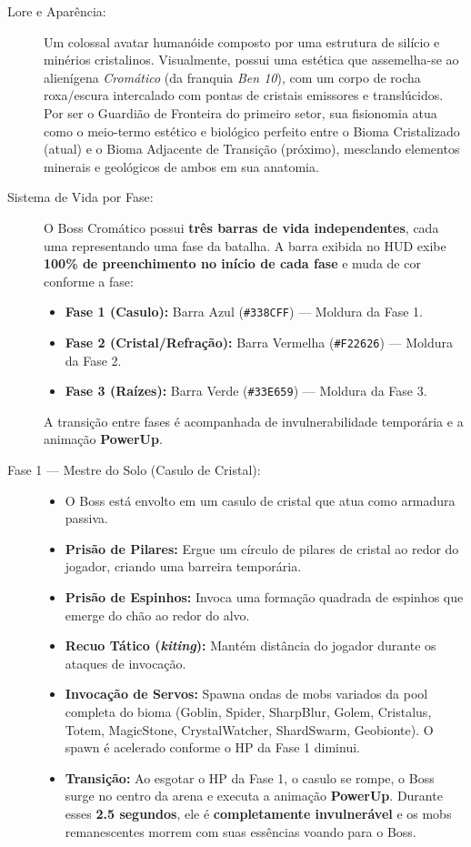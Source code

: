 \documentclass[a4paper,12pt]{report}
\begin{document}
\begin{description}
    \item[Lore e Aparência:]
    Um colossal avatar humanóide composto por uma estrutura de silício e minérios cristalinos. Visualmente, possui uma estética que assemelha-se ao alienígena \textit{Cromático} (da franquia \textit{Ben 10}), com um corpo de rocha roxa/escura intercalado com pontas de cristais emissores e translúcidos. Por ser o Guardião de Fronteira do primeiro setor, sua fisionomia atua como o meio-termo estético e biológico perfeito entre o Bioma Cristalizado (atual) e o Bioma Adjacente de Transição (próximo), mesclando elementos minerais e geológicos de ambos em sua anatomia.

    \item[Sistema de Vida por Fase:]
    O Boss Cromático possui \textbf{três barras de vida independentes}, cada uma representando uma fase da batalha. A barra exibida no HUD exibe \textbf{100\% de preenchimento no início de cada fase} e muda de cor conforme a fase:
    \begin{itemize}
        \item \textbf{Fase 1 (Casulo):} Barra Azul (\texttt{\#338CFF}) --- Moldura da Fase 1.
        \item \textbf{Fase 2 (Cristal/Refração):} Barra Vermelha (\texttt{\#F22626}) --- Moldura da Fase 2.
        \item \textbf{Fase 3 (Raízes):} Barra Verde (\texttt{\#33E659}) --- Moldura da Fase 3.
    \end{itemize}
    A transição entre fases é acompanhada de invulnerabilidade temporária e a animação \textbf{PowerUp}.

    \item[Fase 1 --- Mestre do Solo (Casulo de Cristal):]
    \begin{itemize}
        \item O Boss está envolto em um casulo de cristal que atua como armadura passiva.
        \item \textbf{Prisão de Pilares:} Ergue um círculo de pilares de cristal ao redor do jogador, criando uma barreira temporária.
        \item \textbf{Prisão de Espinhos:} Invoca uma formação quadrada de espinhos que emerge do chão ao redor do alvo.
        \item \textbf{Recuo Tático (\textit{kiting}):} Mantém distância do jogador durante os ataques de invocação.
        \item \textbf{Invocação de Servos:} Spawna ondas de mobs variados da pool completa do bioma (Goblin, Spider, SharpBlur, Golem, Cristalus, Totem, MagicStone, CrystalWatcher, ShardSwarm, Geobionte). O spawn é acelerado conforme o HP da Fase 1 diminui.
        \item \textbf{Transição:} Ao esgotar o HP da Fase 1, o casulo se rompe, o Boss surge no centro da arena e executa a animação \textbf{PowerUp}. Durante esses \textbf{2.5 segundos}, ele é \textbf{completamente invulnerável} e os mobs remanescentes morrem com suas essências voando para o Boss.
    \end{itemize}


\end{description}
\end{document}

